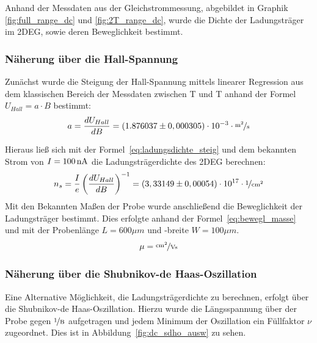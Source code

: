 

Anhand der Messdaten aus der Gleichstrommessung, abgebildet in Graphik \ref{fig:full_range_dc} und \ref{fig:2T_range_dc}, wurde die Dichte der Ladungsträger im 2DEG, sowie deren Beweglichkeit bestimmt.

\subsubsection{Näherung über die Hall-Spannung}
\label{ch:naeherung_hall}

Zunächst wurde die Steigung der Hall-Spannung mittels linearer Regression aus dem klassischen Bereich der Messdaten zwischen \unit[-2]{T} und \unit[2]{T} anhand der Formel $ U_{Hall}=a\cdot B $  
bestimmt:
\begin{equation}
	a=\d{U_{Hall}}{B} = (1.876037 \pm 0,000305)\cdot10^{-3} \cdot  \unitfrac{m^2}{s}
\end{equation} %

Hieraus ließ sich mit der Formel~\eqref{eq:ladungsdichte_steig} und dem bekannten Strom von $I=\unit[100]{nA}$ die Ladungsträgerdichte des 2DEG berechnen: 
\begin{equation}
	n_s= \frac{I}{e}\left({\d{U_{Hall}}{B}}\right)^{-1}=(3,33149 \pm 0,00054) \cdot 10^{17}\cdot \unitfrac{1}{cm^2}
\end{equation} %
Mit den Bekannten Maßen der Probe wurde anschließend die Beweglichkeit der Ladungsträger bestimmt. Dies erfolgte anhand der Formel~\ref{eq:bewegl_masse} und mit der Probenlänge $L=600\mu m$ und -breite $W=100\mu m$.\\
\begin{equation}
\mu= \unitfrac{cm^2}{Vs} %
\end{equation}
 
\subsubsection{Näherung über die Shubnikov-de Haas-Oszillation}
\label{ch:naeherung_sdho}

Eine Alternative Möglichkeit, die Ladungsträgerdichte zu berechnen, erfolgt über die Shubnikov-de Haas-Oszillation. Hierzu wurde die Längsspannung über der Probe 
 gegen $\unitfrac{1}{B}$ aufgetragen und jedem Minimum der Oszillation ein Füllfaktor $\nu$ zugeordnet. Dies ist in Abbildung~\ref{fig:dc_sdho_ausw} zu sehen. 

